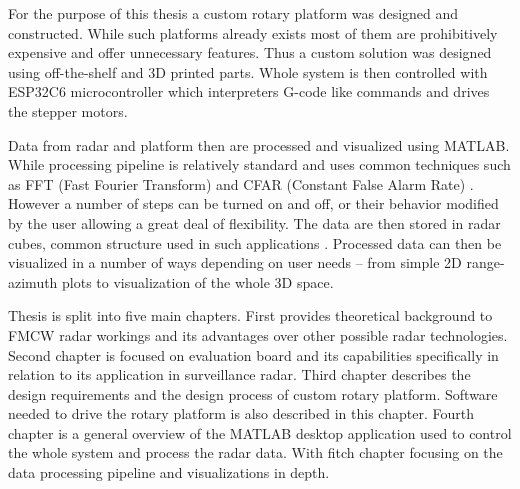For the purpose of this thesis a custom rotary platform was designed and constructed.
While such platforms already exists \cite{standa, carl} most of them are prohibitively expensive and offer unnecessary features.
Thus a custom solution was designed using off-the-shelf and 3D printed parts.
Whole system is then controlled with ESP32C6 microcontroller which interpreters G-code like commands and drives the stepper motors.

Data from radar and platform then are processed and visualized using MATLAB.
While processing pipeline is relatively standard and uses common techniques such as FFT (Fast Fourier Transform) and CFAR (Constant False Alarm Rate) \cite{richards2022}.
However a number of steps can be turned on and off, or their behavior modified by the user allowing a great deal of flexibility.
The data are then stored in radar cubes, common structure used in such applications \cite{richards2022}.
Processed data can then be visualized in a number of ways depending on user needs -- from simple 2D range-azimuth plots to visualization of the whole 3D space.

Thesis is split into five main chapters.
First provides theoretical background to FMCW radar workings and its advantages over other possible radar technologies.
Second chapter is focused on \sidar evaluation board and its capabilities specifically in relation to its application in surveillance radar.
Third chapter describes the design requirements and the design process of custom rotary platform.
Software needed to drive the rotary platform is also described in this chapter.
Fourth chapter is a general overview of the MATLAB desktop application used to control the whole system and process the radar data.
With fitch chapter focusing on the data processing pipeline and visualizations in depth.
